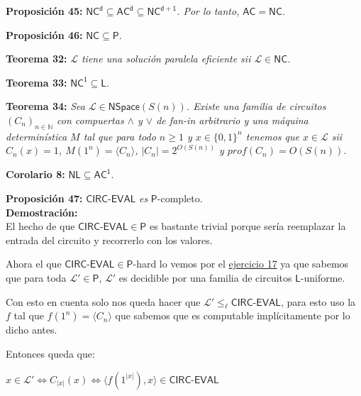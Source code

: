 \documentclass{article}
\begin{document}
\begin{flushleft}
  \textbf{Proposición 45:}
  $\mathsf{NC^d \subseteq AC^d \subseteq NC^{d+1}}$\textit{. Por lo tanto,} $\mathsf{AC = NC}$.
\end{flushleft}

\begin{flushleft}
  \textbf{Proposición 46:}
  $\mathsf{NC \subseteq P}$.
\end{flushleft}

\begin{flushleft}
  \textbf{Teorema 32:}
  \textit{$\mathcal{L}$ tiene una solución paralela eficiente sii $\mathcal{L} \in \mathsf{NC}$.}
\end{flushleft}

\begin{flushleft}
  \textbf{Teorema 33:}
  $\mathsf{NC^1 \subseteq L}$.
\end{flushleft}

\begin{flushleft}
  \textbf{Teorema 34:}
  \textit{Sea $\mathcal{L}\in \mathsf{NSpace}(S(n))$. Existe una familia de circuitos $(C_n)_{n \in \mathbb{N}}$ 
  con compuertas $\land$ y $\lor$ de fan-in arbitrario y una máquina determinística $M$ tal que para todo
  $n \geq 1$ y $x \in \{0,1\}^n$ tenemos que $x \in \mathcal{L}$ sii $C_n(x) = 1$, $M (1^n) = \langle C_n \rangle$,
  $|C_n| = 2^{O(S(n))}$ y $prof(C_n) = O(S(n))$.}
\end{flushleft}

\begin{flushleft}
  \textbf{Corolario 8:}
  $\mathsf{NL \subseteq AC^1}$.
\end{flushleft}

\begin{flushleft}
  \textbf{Proposición 47:}
  $\mathsf{CIRC}$-$\mathsf{EVAL}$ \textit{es} $\mathsf{P}$-completo. \\ [0.5em]

  \textbf{\textcolor{Mulberry}{Demostración:}} \\[0.5em]

  El hecho de que \textcolor{Mulberry}{$\mathsf{CIRC}$-$\mathsf{EVAL \in P}$} es bastante trivial porque sería 
  reemplazar la entrada del circuito y recorrerlo con los valores.

  Ahora el que \textcolor{Mulberry}{$\mathsf{CIRC}$-$\mathsf{EVAL \in P}$-hard} lo vemos por el \hyperlink{ej17}
  {\textcolor{Rhodamine}{ejercicio 17}} ya que sabemos que para toda $\mathcal{L'} \in \mathsf{P}$, $\mathcal{L'}$
  es decidible por una familia de circuitos $\mathsf{L}$-uniforme.

  Con esto en cuenta solo nos queda hacer que $\mathcal{L'} \leq_\ell \mathsf{CIRC}$-$\mathsf{EVAL}$, para esto uso
  la $f$ tal que $f(1^n) = \langle C_n \rangle$ que sabemos que es computable implícitamente por lo dicho antes.

  Entonces queda que:
\end{flushleft}
\begin{center}
  $x \in \mathcal{L'} \iff C_{|x|}(x) \iff \langle f(1^{|x|}), x \rangle \in \mathsf{CIRC}$-$\mathsf{EVAL}$
\end{center}
\end{document}
